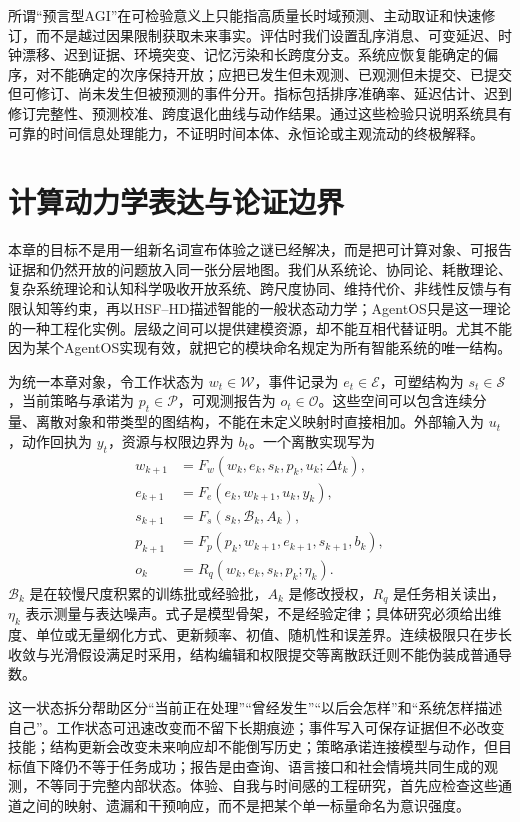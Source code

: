 所谓“预言型AGI”在可检验意义上只能指高质量长时域预测、主动取证和快速修订，而不是越过因果限制获取未来事实。评估时我们设置乱序消息、可变延迟、时钟漂移、迟到证据、环境突变、记忆污染和长跨度分支。系统应恢复能确定的偏序，对不能确定的次序保持开放；应把已发生但未观测、已观测但未提交、已提交但可修订、尚未发生但被预测的事件分开。指标包括排序准确率、延迟估计、迟到修订完整性、预测校准、跨度退化曲线与动作结果。通过这些检验只说明系统具有可靠的时间信息处理能力，不证明时间本体、永恒论或主观流动的终极解释。

\section{计算动力学表达与论证边界}
本章的目标不是用一组新名词宣布体验之谜已经解决，而是把可计算对象、可报告证据和仍然开放的问题放入同一张分层地图。我们从系统论、协同论、耗散理论、复杂系统理论和认知科学吸收开放系统、跨尺度协同、维持代价、非线性反馈与有限认知等约束，再以HSF--HD描述智能的一般状态动力学；AgentOS只是这一理论的一种工程化实例。层级之间可以提供建模资源，却不能互相代替证明。尤其不能因为某个AgentOS实现有效，就把它的模块命名规定为所有智能系统的唯一结构。

为统一本章对象，令工作状态为 $w_t\in\mathcal W$，事件记录为 $e_t\in\mathcal E$，可塑结构为 $s_t\in\mathcal S$，当前策略与承诺为 $p_t\in\mathcal P$，可观测报告为 $o_t\in\mathcal O$。这些空间可以包含连续分量、离散对象和带类型的图结构，不能在未定义映射时直接相加。外部输入为 $u_t$，动作回执为 $y_t$，资源与权限边界为 $b_t$。一个离散实现写为
\[
\begin{aligned}
w_{k+1}&=F_w(w_k,e_k,s_k,p_k,u_k;\Delta t_k),\\
e_{k+1}&=F_e(e_k,w_{k+1},u_k,y_k),\\
s_{k+1}&=F_s(s_k,\mathcal B_k,A_k),\\
p_{k+1}&=F_p(p_k,w_{k+1},e_{k+1},s_{k+1},b_k),\\
o_k&=R_q(w_k,e_k,s_k,p_k;\eta_k).
\end{aligned}
\]
$\mathcal B_k$ 是在较慢尺度积累的训练批或经验批，$A_k$ 是修改授权，$R_q$ 是任务相关读出，$\eta_k$ 表示测量与表达噪声。式子是模型骨架，不是经验定律；具体研究必须给出维度、单位或无量纲化方式、更新频率、初值、随机性和误差界。连续极限只在步长收敛与光滑假设满足时采用，结构编辑和权限提交等离散跃迁则不能伪装成普通导数。

这一状态拆分帮助区分“当前正在处理”“曾经发生”“以后会怎样”和“系统怎样描述自己”。工作状态可迅速改变而不留下长期痕迹；事件写入可保存证据但不必改变技能；结构更新会改变未来响应却不能倒写历史；策略承诺连接模型与动作，但目标值下降仍不等于任务成功；报告是由查询、语言接口和社会情境共同生成的观测，不等同于完整内部状态。体验、自我与时间感的工程研究，首先应检查这些通道之间的映射、遗漏和干预响应，而不是把某个单一标量命名为意识强度。


